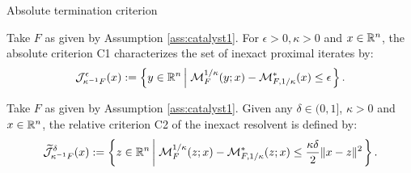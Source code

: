 \documentclass[11pt]{beamer}
\theoremstyle{definition}
\begin{document}
        \begin{frame}{Absolute termination criterion}
            \begin{definition}\label{def:catalyst-termination-c1}
                Take $F$ as given by Assumption \ref{ass:catalyst1}.
                For $\epsilon > 0, \kappa > 0$ and $x \in \mathbb R^n$, the absolute criterion C1 characterizes the set of inexact proximal iterates by: 
                \begin{align*}
                    \mathcal J_{\kappa^{-1} F}^\epsilon (x) := 
                    \left\lbrace
                        y \in \mathbb R^n \left | \; 
                                \mathcal M^{1/\kappa}_F (y; x) - 
                                \mathcal M^*_{F, 1/\kappa}(x) \le \epsilon
                        \right.
                    \right\rbrace. 
                \end{align*}
            \end{definition}
            \begin{definition}\label{def:catalyst-termination-c2}
                Take $F$ as given by Assumption \ref{ass:catalyst1}. 
                Given any $\delta \in (0, 1]$, $\kappa > 0$ and $x \in \mathbb R^n$, the relative criterion C2 of the inexact resolvent is defined by: 
                {\small
                \begin{align*}
                    \widetilde{\mathcal J}_{\kappa^{-1}F}^\delta (x)
                    := 
                    \left\lbrace
                        z \in \mathbb R^n \left| \;
                            \mathcal M_F^{1/\kappa}(z; x) - 
                            \mathcal M^*_{F, 1/\kappa}(z; x)
                            \le \frac{\kappa\delta}{2}\Vert x - z\Vert^2
                        \right.
                    \right\rbrace. 
                \end{align*}
                }
            \end{definition}
        \end{frame}
\end{document}
